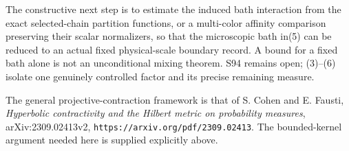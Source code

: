 \documentclass{article}
\begin{document}
The constructive next step is to estimate the induced bath interaction from the exact selected-chain partition functions, or a multi-color affinity comparison preserving their scalar normalizers, so that the microscopic bath in(5) can be reduced to an actual fixed physical-scale boundary record. A bound for a fixed bath alone is not an unconditional mixing theorem. S94 remains open; (3)--(6) isolate one genuinely controlled factor and its precise remaining measure.

The general projective-contraction framework is that of S. Cohen and E. Fausti, \emph{Hyperbolic contractivity and the Hilbert metric on probability measures}, arXiv:2309.02413v2, \texttt{https://arxiv.org/pdf/2309.02413}. The bounded-kernel argument needed here is supplied explicitly above.
\end{document}
